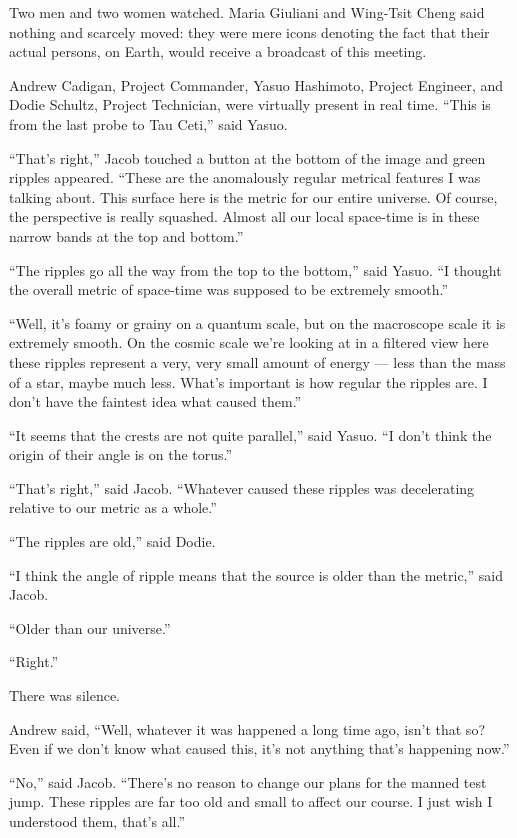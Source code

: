 \documentclass[english,11pt,letterpaper,onecolumn]{scrbook}
\begin{document}
	Two men and two women watched.  Maria Giuliani and Wing-Tsit Cheng said nothing and scarcely moved:  they were mere icons denoting the fact that their actual persons, on Earth, would receive a broadcast of this meeting.

	Andrew Cadigan, Project Commander, Yasuo Hashimoto, Project Engineer, and Dodie Schultz, Project Technician, were virtually present in real time.  ``This is from the last probe to Tau Ceti,'' said Yasuo.

	``That's right,'' Jacob touched a button at the bottom of the image and green ripples appeared.  ``These are the anomalously regular metrical features I was talking about.  This surface here is the metric for our entire universe.  Of course, the perspective is really squashed.  Almost all our local space-time is in these narrow bands at the top and bottom.''

	``The ripples go all the way from the top to the bottom,'' said Yasuo.  ``I thought the overall metric of space-time was supposed to be extremely smooth.''

	``Well, it's foamy or grainy on a quantum scale, but on the macroscope scale it is extremely smooth.  On the cosmic scale we're looking at in a filtered view here these ripples represent a very, very small amount of energy --- less than the mass of a star, maybe much less.  What's important is how regular the ripples are.  I don't have the faintest idea what caused them.''

	``It seems that the crests are not quite parallel,'' said Yasuo.  ``I don't think the origin of their angle is on the torus.'' 

	``That's right,'' said Jacob.  ``Whatever caused these ripples was decelerating relative to our metric as a whole.''

	``The ripples are old,'' said Dodie.

	``I think the angle of ripple means that the source is older than the metric,'' said Jacob.

	``Older than our universe.''

	``Right.''

	There was silence.

	Andrew said, ``Well, whatever it was happened a long time ago, isn't that so?  Even if we don't know what caused this, it's not anything that's happening now.''

	``No,'' said Jacob.  ``There's no reason to change our plans for the manned test jump.  These ripples are far too old and small to affect our course.  I just wish I understood them, that's all.''
\end{document}
